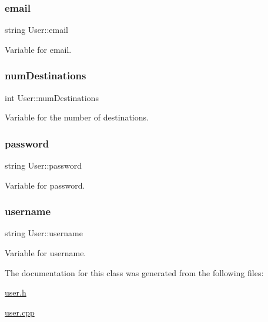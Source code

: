 \subsubsection{\texorpdfstring{email}{email}}
{\footnotesize\ttfamily string User\+::email\hspace{0.3cm}{\ttfamily [private]}}

Variable for email. \mbox{\label{class_user_a86e12420fb10daa28b68ee2f0c3caa00}} 
\subsubsection{\texorpdfstring{num\+Destinations}{numDestinations}}
{\footnotesize\ttfamily int User\+::num\+Destinations\hspace{0.3cm}{\ttfamily [private]}}

Variable for the number of destinations. \mbox{\label{class_user_ab537b9a55bc7d7fcafcdf8e53d085e67}} 
\subsubsection{\texorpdfstring{password}{password}}
{\footnotesize\ttfamily string User\+::password\hspace{0.3cm}{\ttfamily [private]}}

Variable for password. \mbox{\label{class_user_ad1f3276105af51c570f5434e516ee30f}} 
\subsubsection{\texorpdfstring{username}{username}}
{\footnotesize\ttfamily string User\+::username\hspace{0.3cm}{\ttfamily [private]}}

Variable for username. 

The documentation for this class was generated from the following files\+:\begin{DoxyCompactItemize}
\item 
\hyperlink{user_8h}{user.\+h}\item 
\hyperlink{user_8cpp}{user.\+cpp}\end{DoxyCompactItemize}
